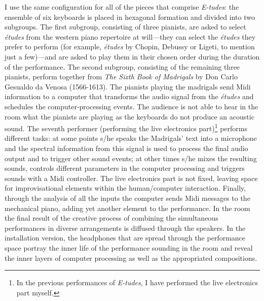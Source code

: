 I use the same configuration for all of the pieces that comprise \emph{E-tudes}: the ensemble of six keyboards is placed in hexagonal formation and divided into two subgroups. The first subgroup, consisting of three pianists, are asked to select \emph{\'{e}tudes} from the western piano repertoire at will---they can select the \emph{\'{e}tudes} they prefer to perform (for example, \emph{\'{e}tudes} by Chopin, Debussy or Ligeti, to mention just a few)---and are asked to play them in their chosen order during the duration of the performance. The second subgroup, consisting of the remaining three pianists, perform together from \emph{The Sixth Book of Madrigals} by Don Carlo Gesualdo da Venosa (1566-1613). The pianists playing the madrigals send Midi information to a computer that transforms the audio signal from the \emph{\'{e}tudes} and schedules the computer-processing events. The audience is not able to hear in the room what the pianists are playing as the keyboards do not produce an acoustic sound. The seventh performer (performing the live electronics part)\footnote{In the previous performances of \emph{E-tudes}, I have performed the live electronics part myself.} performs different tasks: at some points s/he speaks the Madrigals' text into a microphone and the spectral information from this signal is used to process the final audio output and to trigger other sound events; at other times s/he mixes the resulting sounds, controls different parameters in the computer processing and triggers sounds with a Midi controller. The live electronics part is not fixed, leaving space for improvisational elements within the human/computer interaction. Finally, through the analysis of all the inputs the computer sends Midi messages to the mechanical piano, adding yet another element to the performance. In the room the final result of the creative process of combining the simultaneous performances in diverse arrangements is diffused through the speakers. In the installation version, the headphones that are spread through the performance space portray the inner life of the performance sounding in the room and reveal the inner layers of computer processing as well as the appropriated compositions.

